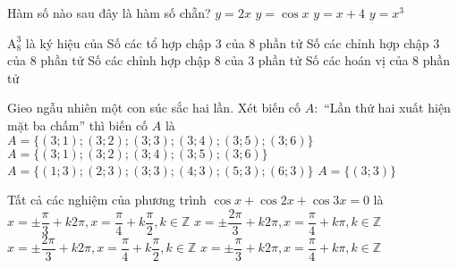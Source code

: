 \begin{ex}%
	Hàm số nào sau đây là hàm số chẵn?
	\choice
	{$y=2x$}
	{\True $y=\cos x$}
	{$y=x+4$}
	{$y=x^3$}
\end{ex}

\begin{ex}%
	$\mathrm{A}_8^3$ là ký hiệu của
	\choice
	{Số các tổ hợp chập $3$ của $8$ phần tử}
	{\True Số các chỉnh hợp chập $3$ của $8$ phần tử}
	{Số các chỉnh hợp chập $8$ của $3$ phần tử}
	{Số các hoán vị của $8$ phần tử}
\end{ex}

\begin{ex}%
	Gieo ngẫu nhiên một con súc sắc hai lần. Xét biến cố $A:$ ``Lần thứ hai xuất hiện mặt ba chấm'' thì biến cố $A$ là
	\choice
	{$A=\{(3;1); (3;2); (3;3); (3;4); (3;5); (3;6)\}$}
	{$A=\{(3;1); (3;2); (3;4); (3;5); (3;6)\}$}
	{\True $A=\{(1;3); (2;3); (3;3); (4;3); (5;3); (6;3)\}$}
	{$A=\{(3;3)\}$}
\end{ex}

\begin{ex}%
	Tất cả các nghiệm của phương trình $\cos x + \cos 2x + \cos 3x = 0$ là
	\choice
	{$x=\pm \dfrac{\pi}{3} + k2\pi, x = \dfrac{\pi}{4}+ k\dfrac{\pi}{2}, k\in\mathbb{Z}$}
	{$x=\pm \dfrac{2\pi}{3} + k2\pi, x = \dfrac{\pi}{4}+ k\pi, k\in\mathbb{Z}$}
	{\True $x=\pm \dfrac{2\pi}{3} + k2\pi, x = \dfrac{\pi}{4}+ k\dfrac{\pi}{2}, k\in\mathbb{Z}$}
	{$x=\pm \dfrac{\pi}{3} + k2\pi, x = \dfrac{\pi}{4}+ k\pi, k\in\mathbb{Z}$}
	\loigiai{
	$\cos x + \cos 2x + \cos 3x = 0 \Leftrightarrow (\cos x + \cos 3x) + \cos 2x = 0 \Leftrightarrow 2\cos 2x . \cos x + \cos 2x = 0$\\
	$\Leftrightarrow \left[ \begin{array}{l} \cos 2x = 0 \\ \cos x = -\dfrac{1}{2} \end{array} \right.
	\Leftrightarrow \left[ \begin{array}{l} 2x = \dfrac{\pi}{2} + k\pi \\  x = \pm \dfrac{2\pi}{3} + k2\pi \end{array} \right.
	\Leftrightarrow \left[ \begin{array}{l} x = \dfrac{\pi}{4} + k\dfrac{\pi}{2} \\  x = \pm \dfrac{2\pi}{3} + k2\pi, \end{array} \right.$ $k\in\mathbb{Z}$.
	}
\end{ex}

